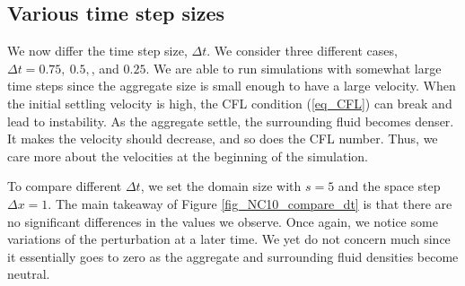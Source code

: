 \subsection{Various time step sizes}
We now differ the time step size, $\Delta t$. We consider three different cases, $\Delta t = 0.75, \ 0.5, $, and $0.25$. We are able to run simulations with somewhat large time steps since the aggregate size is small enough to have a large velocity. When the initial settling velocity is high, the CFL condition (\ref{eq_CFL}) can break and lead to instability. As the aggregate settle, the surrounding fluid becomes denser. It makes the velocity should decrease, and so does the CFL number. Thus, we care more about the velocities at the beginning of the simulation. 
\par
To compare different $\Delta t$, we set the domain size with $s = 5$ and the space step $\Delta x =1$.
The main takeaway of Figure \ref{fig_NC10_compare_dt} is that there are no significant differences in the values we observe. Once again, we notice some variations of the perturbation at a later time. We yet do not concern much since it essentially goes to zero as the aggregate and surrounding fluid densities become neutral. 
